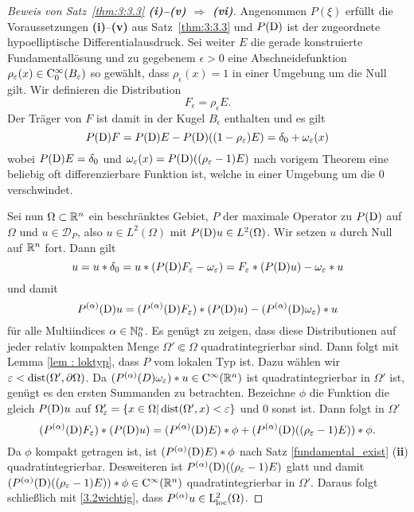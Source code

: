 \begin{proof}[Beweis von Satz~\ref{thm:3:3.3} {\bf (i)--(v) $\Longrightarrow$ (vi)}]
Angenommen $P(\xi)$ erfüllt die Voraussetzungen {\bf (i)}--{\bf(v)} aus Satz~\ref{thm:3:3.3} und $P(\mathrm D)$ ist der zugeordnete hypoelliptische Differentialausdruck. 
Sei weiter $E$ die gerade konstruierte Fundamentallösung und zu gegebenem $\epsilon>0$ eine Abschneidefunktion  $\rho_\varepsilon(x)\in \mathrm C_0^\infty(B_\varepsilon)$ so gewählt, dass $\rho_\epsilon(x)=1$ in einer Umgebung um die Null gilt. Wir definieren die Distribution
\begin{equation}
F_\epsilon= \rho_\epsilon E.
\end{equation}
Der Träger von $F$ ist damit in der Kugel $B_{\epsilon}$ enthalten und es gilt
\begin{equation}
P(\mathrm D) F= P(\mathrm D) E - P(\mathrm D)((1-\rho_\varepsilon)E) =\delta_0 + \omega_\varepsilon(x)
\end{equation}  
wobei $P(\mathrm D)E=\delta_0$ und $\omega_\varepsilon(x)= P(\mathrm D)((\rho_\varepsilon-1)E)$ nach vorigem Theorem eine beliebig oft differenzierbare Funktion ist, welche in einer Umgebung um die $0$ verschwindet.  

Sei nun $\Omega\subset\mathbb R^n$ ein beschränktes Gebiet, $P$ der maximale Operator zu $P(\mathrm D)$ auf $\Omega$ und $u\in \mathcal D_{P}$, also 
$u\in L^2(\Omega)$ mit $P(\mathrm D)u\in L^2(\Omega)$. Wir setzen $u$ durch Null auf $\mathbb R^n$ fort. Dann gilt 
\begin{equation}\label{3.2wichtig1}
u= u*\delta_0 = u * (P(\mathrm D) F_\varepsilon-\omega_\varepsilon) = F_\varepsilon*(P(\mathrm D)u)- \omega_\varepsilon *u
\end{equation}
und damit
\begin{equation}\label{3.2wichtig}
P^{(\alpha)}(\mathrm D) u = (P^{(\alpha)}(\mathrm D)F_\varepsilon)*(P(\mathrm D)u)-(P^{(\alpha)}(\mathrm D) \omega_\varepsilon)*u
\end{equation}
für alle Multiindices $\alpha\in\mathbb N_0^n$. Es genügt zu zeigen, dass diese Distributionen auf jeder relativ kompakten Menge $\Omega'\Subset\Omega$ quadratintegrierbar sind.  Dann folgt mit Lemma \ref{lem : loktyp}, dass $P$ vom lokalen Typ ist. Dazu wählen wir $\varepsilon<\operatorname{dist}(\Omega',\partial\Omega)$. Da
 $(P^{(\alpha)}(D)\omega_\varepsilon)*u\in \mathrm C^\infty(\mathbb R^n)$ ist  quadratintegrierbar in $\Omega'$ ist, genügt es den ersten Summanden zu betrachten. 
Bezeichne $\phi$ die Funktion die gleich $P(\mathrm D)u$ auf $\Omega'_\varepsilon=\{x\in \Omega| \operatorname{dist}(\Omega', x)<\varepsilon\}$ und $0$ sonst ist. Dann folgt in $\Omega'$
\begin{equation}
(P^{(\alpha)}(\mathrm D)F_\varepsilon)* (P(\mathrm D)u) = (P^{(\alpha)}(\mathrm D)E)*\phi+ (P^{(\alpha)}(\mathrm D)((\rho_\varepsilon-1)E))*\phi.
\end{equation}
Da $\phi$ kompakt getragen ist, ist $(P^{(\alpha)}(\mathrm D)E)*\phi$ nach Satz \ref{fundamental_exist} ({\bf ii}) quadratintegrierbar. Desweiteren ist $P^{(\alpha)}(\mathrm D)((\rho_\varepsilon-1)E)$ glatt und damit $(P^{(\alpha)}(\mathrm D)((\rho_\varepsilon-1)E))*\phi\in\mathrm C^\infty(\mathbb R^n)$ quadratintegrierbar in $\Omega'$. Daraus folgt schließlich mit \eqref{3.2wichtig}, dass $P^{(\alpha)}u\in \mathrm L^2_{\text{loc}}(\Omega)$.
\end{proof}


